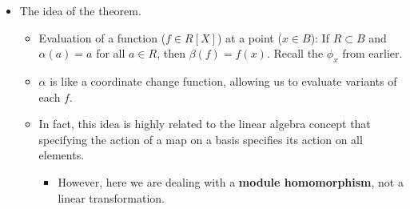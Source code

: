 \documentclass[../notes.tex]{subfiles}
\begin{document}
\begin{itemize}
\begin{proof}
        We first prove that such a ring homomorphism exists. Then we address uniqueness.\par
        Let $\beta(X)=x$. Then if $\beta$ is to be a ring homomorphism, we must have
        \begin{equation*}
            \beta(X^m) = x^m
        \end{equation*}
        for all $m\in\Zg$. We also require that $\beta(a_m)=\alpha(a_m)$ for all $a_m\in R$ (at this point, $a_m$ is just suggestive notation). Again, if $\beta$ is to be a ring homomorphism, it must follow that
        \begin{equation*}
            \beta(a_mX^m) = \beta(a_m)\beta(X^m)
            = \alpha(a_m)x^m
        \end{equation*}
        for all $a_m\in R$, $m\in\Z$. Lastly, if $\beta$ is to be a ring homomorphism, it must follow that
        \begin{equation*}
            \beta\left( \sum_{i=0}^ma_iX^i \right) = \sum_{i=0}^m\beta(a_iX^i)
            = \sum_{i=0}^m\alpha(a_i)x^i
        \end{equation*}
        But then by its construction, $\beta$ is defined on every element in $R[X]$ and is a ring homomorphism satisfying the desired properties.\par
        Suppose $\beta,\beta':R[X]\to B$ are ring homomorphisms satisfing $\beta(a)=\beta'(a)=\alpha(a)$ for all $a\in R$ and $\beta(X)=\beta'(X)=x$. Let $\sum_{i=0}^ma_iX^i\in R[X]$ be arbitrary. Then
        \begin{equation*}
            \beta\left( \sum_{i=0}^ma_iX^i \right) = \sum_{i=0}^m\alpha(a_i)x^i
            = \beta'\left( \sum_{i=0}^ma_iX^i \right)
        \end{equation*}
        as desired.
    \end{proof}
    \item The idea of the theorem.
    \begin{itemize}
        \item Evaluation of a function ($f\in R[X]$) at a point ($x\in B$): If $R\subset B$ and $\alpha(a)=a$ for all $a\in R$, then $\beta(f)=f(x)$. Recall the $\phi_x$ from earlier.
        \item $\alpha$ is like a coordinate change function, allowing us to evaluate variants of each $f$.
        \item In fact, this idea is highly related to the linear algebra concept that specifying the action of a map on a basis specifies its action on all elements.
        \begin{itemize}
            \item However, here we are dealing with a \textbf{module homomorphism}, not a linear transformation.
        \end{itemize}
    \end{itemize}
\end{itemize}
\end{document}
